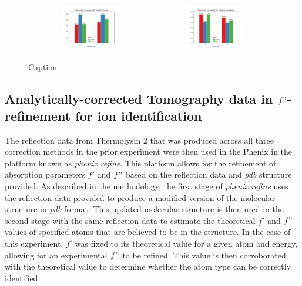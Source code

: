 \begin{figure}[h]
    \centering
    \begin{tabular}{cc}
    \includegraphics[width = 0.5\textwidth]{plots/exp1/tlys_2_P1/I_over_sigma.png} & \includegraphics[width = 0.5\textwidth]{plots/exp1/tlys_2_P1/rmerges.png}
    \end{tabular}
    \caption{Caption}
    \label{fig:tlys_2_p6}
\end{figure}

\subsection{Analytically-corrected Tomography data in $f"$-refinement for ion identification}


The reflection data from Thermolysin 2 that was produced across all three correction methods in the prior experiment were then used in the Phenix in the platform known as \textit{phenix.refine}. This platform allows for the refinement of absorption parameters $f'$ and $f"$ based on the reflection data and \textit{pdb} structure provided. As described in the methodology, the first stage of \textit{phenix.refine} uses the reflection data provided to produce a modified version of the molecular structure in \textit{pdb} format. This updated molecular structure is then used in the second stage with the same reflection data to estimate the theoretical $f'$ and $f"$ values of specified atoms that are believed to be in the structure. In the case of this experiment, $f'$ was fixed to its theoretical value for a given atom and energy, allowing for an experimental $f"$ to be refined. This value is then corroborated with the theoretical value to determine whether the atom type can be correctly identified.%


